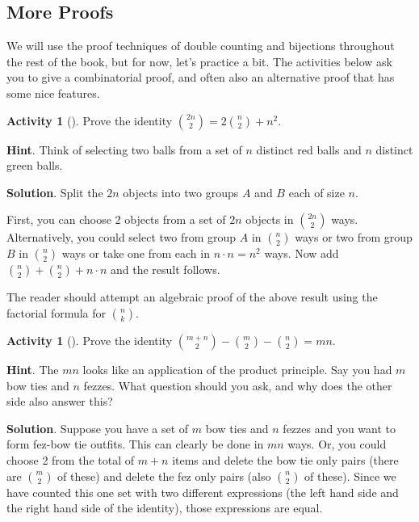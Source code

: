 \documentclass[10pt,]{book}
\theoremstyle{plain}
\theoremstyle{definition}
\theoremstyle{definition}
\theoremstyle{definition}
\newtheorem{activity}[project]{Activity}
\numberwithin{equation}{chapter}
\begin{document}
\subsection[{More Proofs}]{More Proofs}\label{subsec-moreproofs}
\hypertarget{p-677}{}%
We will use the proof techniques of double counting and bijections throughout the rest of the book, but for now, let's practice a bit.  The activities below ask you to give a combinatorial proof, and often also an alternative proof that has some nice features.%
\begin{activity}[]\label{act-redgreenballs}
\hypertarget{p-678}{}%
Prove the identity \(\binom{2n}{2} = 2 \binom{n}{2} + n^{2}\).%
\par\smallskip%
\noindent\textbf{Hint}.\hypertarget{hint-48}{}\quad%
\hypertarget{p-679}{}%
Think of selecting two balls from a set of \(n\) distinct red balls and \(n\) distinct green balls.%
\par\smallskip%
\noindent\textbf{Solution}.\hypertarget{solution-42}{}\quad%
\hypertarget{p-680}{}%
Split the \(2n\) objects into two groups \(A\) and \(B\) each of size \(n\).%
\par
\hypertarget{p-681}{}%
First, you can choose 2 objects from a set of \(2n\) objects in \(\binom{2n}{2}\) ways. Alternatively, you could select two from group \(A\) in \(\binom{n}{2}\) ways or two from group \(B\) in \(\binom{n}{2}\) ways or take one from each in \(n \cdot n = n^{2}\) ways. Now add \(\binom{n}{2} + \binom{n}{2}+ n \cdot n\) and the result follows.%
\end{activity}
\hypertarget{p-682}{}%
The reader should attempt an algebraic proof of the above result using the factorial formula for \(\binom{n}{k}\).%
\begin{activity}[]\label{act-bowtiefez}
\hypertarget{p-683}{}%
Prove the identity \(\binom{m + n}{2} - \binom{m}{2} - \binom{n}{2} = mn\).%
\par\smallskip%
\noindent\textbf{Hint}.\hypertarget{hint-49}{}\quad%
\hypertarget{p-684}{}%
The \(mn\) looks like an application of the product principle.  Say you had \(m\) bow ties and \(n\) fezzes.  What question should you ask, and why does the other side also answer this?%
\par\smallskip%
\noindent\textbf{Solution}.\hypertarget{solution-43}{}\quad%
\hypertarget{p-685}{}%
Suppose you have a set of \(m\) bow ties and \(n\) fezzes and you want to form fez-bow tie outfits. This can clearly be done in \(mn\) ways. Or, you could choose 2 from the total of \(m + n\) items and delete the bow tie only pairs (there are \(\binom{m}{2}\) of these) and delete the fez only pairs (also \(\binom{n}{2}\) of these). Since we have counted this one set with two different expressions (the left hand side and the right hand side of the identity), those expressions are equal.%
\end{activity}
\end{document}
